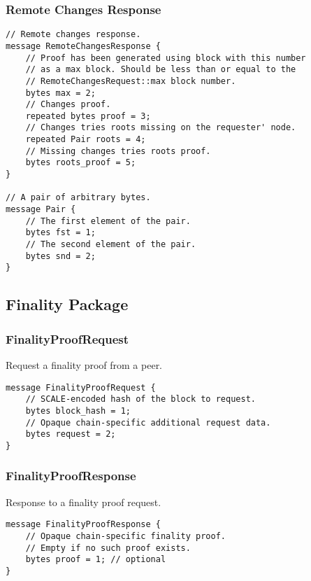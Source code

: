 \documentclass{book}
\begin{document}
\subsubsection{Remote Changes Response}

\begin{lstlisting}[frame=single]
// Remote changes response.
message RemoteChangesResponse {
    // Proof has been generated using block with this number
    // as a max block. Should be less than or equal to the
    // RemoteChangesRequest::max block number.
	bytes max = 2;
	// Changes proof.
	repeated bytes proof = 3;
	// Changes tries roots missing on the requester' node.
	repeated Pair roots = 4;
	// Missing changes tries roots proof.
	bytes roots_proof = 5;
}

// A pair of arbitrary bytes.
message Pair {
	// The first element of the pair.
	bytes fst = 1;
	// The second element of the pair.
	bytes snd = 2;
}
\end{lstlisting}

\subsection{Finality Package}

\subsubsection{FinalityProofRequest}

Request a finality proof from a peer.

\begin{lstlisting}[frame=single]
message FinalityProofRequest {
	// SCALE-encoded hash of the block to request.
	bytes block_hash = 1;
	// Opaque chain-specific additional request data.
	bytes request = 2;
}
\end{lstlisting}

\subsubsection{FinalityProofResponse}

Response to a finality proof request.

\begin{lstlisting}[frame=single]
message FinalityProofResponse {
    // Opaque chain-specific finality proof.
    // Empty if no such proof exists.
	bytes proof = 1; // optional
}
\end{lstlisting}
\end{document}
